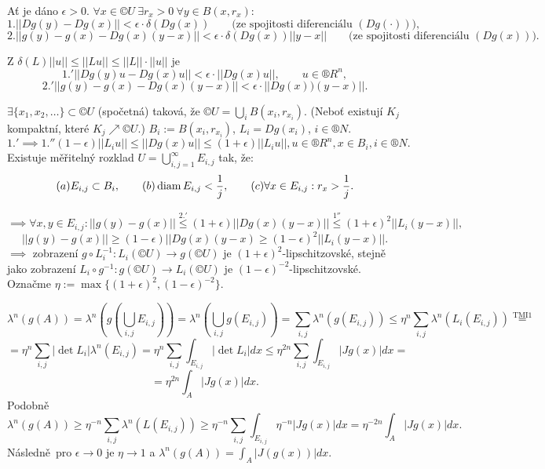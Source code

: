 \documentclass[12pt]{article}					%
\begin{document}
\begin{dukaz}
	Ať je dáno $\epsilon > 0$. $\forall x \in ©U\ \exists r_x > 0\ \forall y \in B(x, r_x)$:
	$$ 1. ||Dg(y) - Dg(x)|| < \epsilon·\delta(Dg(x)) \qquad \text{(ze spojitosti diferenciálu $(Dg(·))$)}, $$
	$$ 2. ||g(y) - g(x) - Dg(x)(y - x)|| < \epsilon·\delta(Dg(x))||y - x|| \qquad \text{(ze spojitosti diferenciálu $(Dg(x))$)}. $$

	Z $\delta(L)||u|| ≤ ||Lu|| ≤ ||L||·||u||$ je
	$$ 1.' ||Dg(y)u - Dg(x)u|| < \epsilon·||Dg(x)u||, \qquad u \in ®R^n, $$
	$$ 2.' ||g(y) - g(x) - Dg(x)(y - x)|| < \epsilon·||Dg(x))(y - x)||. $$

	$\exists \{x_1, x_2, …\} \subset ©U$ (spočetná) taková, že $©U = \bigcup_i B(x_i, r_{x_i})$. (Neboť existují $K_j$ kompaktní, které $K_j \nearrow ©U$.) $B_i := B(x_i, r_{x_i})$, $L_i = Dg(x_i)$, $i \in ®N$.
	$$ 1.' \implies 1.'' (1 - \epsilon)||L_iu|| ≤ ||Dg(x)u|| ≤ (1 + \epsilon)||L_iu||, u \in ®R^n, x \in B_i, i \in ®N. $$
	Existuje měřitelný rozklad $U = \bigcup_{i, j = 1}^∞ E_{i, j}$ tak, že:
	$$ (a) E_{i, j} \subset B_i, \qquad (b) \operatorname{diam} E_{i, j} < \frac{1}{j}, \qquad (c) \forall x \in E_{i, j}: r_x > \frac{1}{j}. $$

	$$ \implies \forall x, y \in E_{i, j}: ||g(y) - g(x)|| \overset{2.'}{≤} (1 + \epsilon)||Dg(x)(y-x)|| \overset{1''}{≤} (1 + \epsilon)^2 ||L_i(y - x)||, $$
	$$ ||g(y) - g(x)|| ≥ (1 - \epsilon)||Dg(x)(y - x) ≥ (1 - \epsilon)^2 ||L_i(y - x)||. $$
	$\implies$ zobrazení $g \circ L_i^{-1}: L_i(©U) \rightarrow g(©U)$ je $(1 + \epsilon)^2$-lipschitzovské, stejně jako zobrazení $L_i \circ g^{-1}: g(©U) \rightarrow L_i(©U)$ je $(1 - \epsilon)^{-2}$-lipschitzovské. Označme $\eta := \max\{(1 + \epsilon)^2, (1 - \epsilon)^{-2}\}$.

	$$ \lambda^n(g(A)) = \lambda^n(g(\bigcup_{i, j} E_{i, j})) = \lambda^n(\bigcup_{i, j} g(E_{i, j})) = \sum_{i, j} \lambda^n(g(E_{i, j})) ≤ \eta^n \sum_{i, j}\lambda^n(L_i(E_{i, j})) \overset{\text{TMI1}}{=} $$
	$$ = \eta^n \sum_{i, j} |\det L_i| \lambda^n(E_{i, j}) = \eta^n \sum_{i, j}\int_{E_{i, j}} |\det L_i| dx ≤ \eta^{2n} \sum_{i, j} \int_{E_{i, j}} |J g(x)|dx = $$
	$$ = \eta^{2n} \int_A |Jg(x)|dx. $$
	Podobně
	$$ \lambda^n(g(A)) ≥ \eta^{-n}\sum_{i, j} \lambda^n(L(E_{i, j})) ≥ \eta^{-n} \sum_{i, j} \int_{E_{i, j}}\eta^{-n}|Jg(x)| dx = \eta^{-2n}\int_A |Jg(x)| dx. $$
	Následně pro $\epsilon \rightarrow 0$ je $\eta \rightarrow 1$ a $\lambda^n(g(A)) = \int_A|J(g(x))|dx$.
\end{dukaz}
\end{document}
